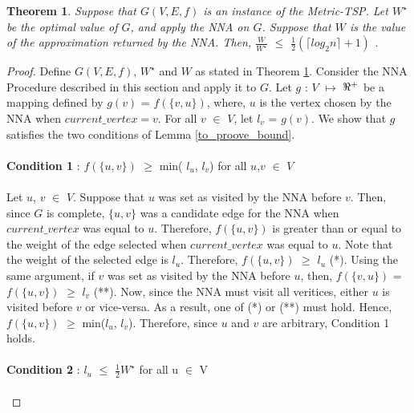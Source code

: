 \documentclass[12pt]{article}
\newtheorem{theorem}[definition]{Theorem}
\numberwithin{equation}{subsection}
\numberwithin{table}{subsection}
\begin{document}
\begin{theorem}
\label{log_bound_thrm}
Suppose that $G(V,E,f)$ is an instance of the Metric-TSP. Let $W^\star$ be the optimal value of $G$, and apply the NNA on $G$. Suppose that $W$ is the value of the approximation returned by the NNA. Then, $\frac{W}{W^\star}$ $\leq$ $\frac{1}{2}(\lceil log_2 n \rceil + 1)$ {\normalfont\cite{Rosenkrantz}}.
\end{theorem}
\begin{proof}
Define $G(V,E,f)$, $W^\star$ and $W$ as stated in Theorem \ref{log_bound_thrm}. Consider the NNA Procedure described in this section and apply it to $G$. Let $g$ : $V$ $\mapsto$ $\real^+$ be a mapping defined by $g(v)$ = $f(\{v,u\})$, where, $u$ is the vertex chosen by the NNA when $current\_vertex = v$. For all $v$ $\in$ $V$, let $l_v$ = $g(v)$. We show that $g$ satisfies the two conditions of Lemma \ref{to_proove_bound}.\\\\
\textbf{Condition 1} :  $f(\{u, v\})$ $\geq$ min( $l_u$, $l_v$) for all $u$,$v$ $\in$ $V$\\\\
Let $u$, $v$ $\in$ $V$. Suppose that $u$ was set as visited by the NNA before $v$. Then, since $G$ is complete, $\{u, v\}$ was a candidate edge for the NNA when $current\_vertex$ was equal to $u$. Therefore, $f(\{u, v\})$ is greater than or equal to the weight of the edge selected when $current\_vertex$ was equal to $u$. Note that the weight of the selected edge is $l_u$. Therefore, $f(\{u, v\})$ $\geq$ $l_u$ (*). Using the same argument, if $v$ was set as visited by the NNA before $u$, then, $f(\{v, u\})$ = $f(\{u, v\})$ $\geq$ $l_v$ (**). Now, since the NNA must visit all veritices, either $u$ is visited before $v$ or vice-versa. As a result, one of (*) or (**) must hold. Hence, $f(\{u, v\})$ $\geq$ min($l_u$, $l_v$). Therefore, since $u$ and $v$ are arbitrary, Condition 1 holds.\\\\
\textbf{Condition 2} :  $l_u$ $\leq$ $\frac{1}{2}W^\star$ for all u $\in$ V\\\\

\end{proof}
\end{document}
